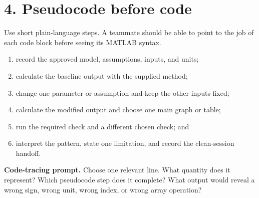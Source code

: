 \documentclass[11pt,a4paper]{article}
\begin{document}
\section*{4. Pseudocode before code}
Use short plain-language steps. A teammate should be able to point to the job of each code block before seeing its MATLAB syntax.
\begin{enumerate}[nosep,leftmargin=6mm]
\item record the approved model, assumptions, inputs, and units;
\item calculate the baseline output with the supplied method;
\item change one parameter or assumption and keep the other inputs fixed;
\item calculate the modified output and choose one main graph or table;
\item run the required check and a different chosen check; and
\item interpret the pattern, state one limitation, and record the clean-session handoff.
\end{enumerate}
\begin{keybox}\textbf{Code-tracing prompt.} Choose one relevant line. What quantity does it represent? Which pseudocode step does it complete? What output would reveal a wrong sign, wrong unit, wrong index, or wrong array operation?\end{keybox}
\end{document}
